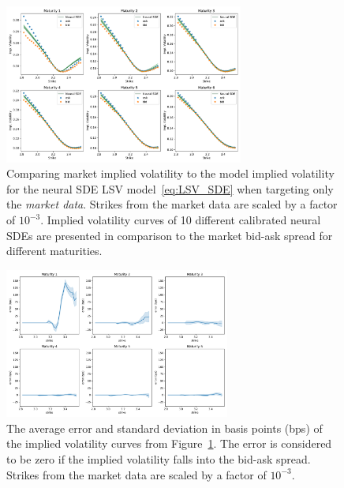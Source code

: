 \begin{figure}[H]
  \centering 
	\includegraphics[clip, width=0.7\textwidth]{content/reschap1/Figures/figures_SPX/iv_nsde_unbounded.pdf}
  \caption{Comparing market implied volatility to the model implied volatility for the neural SDE LSV model~\eqref{eq:LSV_SDE} when targeting only the {\em market data}. Strikes from the market data are scaled by a factor of $10^{-3}$. Implied volatility curves of 10 different calibrated neural SDEs are presented in comparison to the market bid-ask spread for different maturities.
}
\label{fig:SPX LSV calibration iv}  
\end{figure}


\begin{figure}[H]
  \centering 
	\includegraphics[clip, width=0.66\textwidth]{content/reschap1/Figures/figures_SPX/iv_error_unbounded.pdf}
  \caption{The average error and standard deviation in basis points (bps) of the implied volatility curves from Figure~\ref{fig:SPX LSV calibration iv}. The error is considered to be zero if the implied volatility falls into the bid-ask spread. Strikes from the market data are scaled by a factor of $10^{-3}$.  
}
\label{fig:SPX LSV calibration iv error}  
\end{figure}


